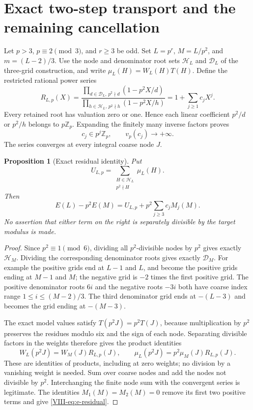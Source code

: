 \documentclass[11pt,letterpaper]{article}
\newtheorem{proposition}[theorem]{Proposition}
\numberwithin{equation}{section}
\begin{document}
\section{Exact two-step transport and the remaining cancellation}\label{loc-VIII-15}
Let $p>3$, $p\equiv2\pmod3$, and $r\ge3$ be odd. Set
$L=p^r$, $M=L/p^2$, and $m=(L-2)/3$. Use the node and denominator
root sets $\mathcal H_L$ and $\mathcal D_L$ of the three-grid
construction, and write $\mu_L(H)=W_L(H)T(H)$.
Define the restricted rational power series
\[
 R_{L,p}(X)=
 \frac{\prod_{d\in\mathcal D_L,\,p^2\nmid d}(1-p^2X/d)}
 {\prod_{h\in\mathcal H_L,\,p^2\nmid h}(1-p^2X/h)}
 =1+\sum_{j\ge1}c_jX^j.
\]
Every retained root has valuation zero or one. Hence each linear
coefficient $p^2/d$ or $p^2/h$ belongs to $p\mathbb Z_p$.
Expanding the finitely many inverse factors proves
\[
 c_j\in p^j\mathbb Z_p,\qquad v_p(c_j)\longrightarrow+\infty.
\]
The series converges at every integral coarse node $J$.

\begin{proposition}[Exact residual identity]\label{VIII-prop:e-residual}
Put
\[
 U_{L,p}=\sum_{\substack{H\in\mathcal H_L\\p^2\nmid H}}\mu_L(H).
\]
Then
\begin{equation}\label{VIII-eq:e-residual}
 \boxed{E(L)-p^2E(M)
 =U_{L,p}+p^2\sum_{j\ge3}c_j M_j(M).}
\end{equation}
No assertion that either term on the right is separately divisible
by the target modulus is made.
\end{proposition}
\begin{proof}
Since $p^2\equiv1\pmod6$, dividing all $p^2$-divisible nodes by
$p^2$ gives exactly $\mathcal H_M$. Dividing the corresponding
denominator roots gives exactly $\mathcal D_M$. For example the
positive grids end at $L-1$ and $L$, and become the positive grids
ending at $M-1$ and $M$; the negative grid is $-2$ times the first
positive grid. The positive denominator roots $6i$ and the negative
roots $-3i$ both have coarse index range
$1\le i\le(M-2)/3$. The third denominator grid ends at $-(L-3)$
and becomes the grid ending at $-(M-3)$.

The exact model values satisfy $T(p^2J)=p^2T(J)$, because
multiplication by $p^2$ preserves the residues modulo six and the
sign of each node. Separating divisible factors in the weights
therefore gives the product identities
\[
 W_L(p^2J)=W_M(J)R_{L,p}(J),\qquad
 \mu_L(p^2J)=p^2\mu_M(J)R_{L,p}(J).
\]
These are identities of products, including at zero weights;
no division by a vanishing weight is needed. Sum over coarse nodes
and add the nodes not divisible by $p^2$. Interchanging the finite
node sum with the convergent series is legitimate. The identities
$M_1(M)=M_2(M)=0$ remove its first two positive terms and give
\eqref{VIII-eq:e-residual}.
\end{proof}
\end{document}
